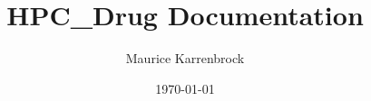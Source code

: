 \documentclass[a4paper,12pt,oneside]{book}
\begin{document}
		\title{HPC\_Drug Documentation}
		\author{Maurice Karrenbrock}
		\date{\today}
		\maketitle

\clearpage\null\thispagestyle{empty}\newpage
	
\tableofcontents

\mainmatter




	




%
\backmatter




\end{document}
